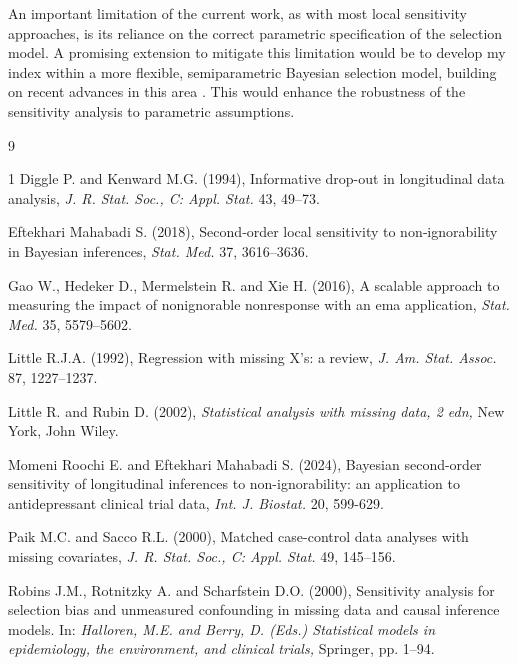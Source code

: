 \documentclass[twoside]{article}
\begin{document}
An important limitation of the current work, as with most local sensitivity
approaches, is its reliance on the correct parametric specification of the selection
model. A promising extension to mitigate this
limitation would be to develop my index within a more flexible, semiparametric
Bayesian selection model, building on recent advances in this area \cite{Sugasawa:et:al:2022}. This would enhance the robustness of
the sensitivity analysis to parametric assumptions.
\begin{thebibliography}{9}
\begin{spacing}{1}
Diggle P. and Kenward  M.G. (1994), Informative drop-out in longitudinal
data analysis, {\it J. R. Stat. Soc., C: Appl. Stat.}
43, 49–73.

Eftekhari Mahabadi S. (2018), Second‐order local sensitivity to non‐ignorability
in Bayesian inferences, {\it Stat. Med.} 37, 3616–3636.

Gao W., Hedeker D., Mermelstein R. and Xie H. (2016), A scalable approach
to measuring the impact of nonignorable nonresponse with an ema application,
{\it Stat. Med.} 35, 5579–5602.

Little R.J.A. (1992), Regression with missing X's: a review, {\it J. Am. Stat. Assoc.} 87,  1227–1237.

Little R. and Rubin D. (2002), {\it Statistical analysis with missing data, 2 edn,}
 New York, John Wiley.
 
Momeni Roochi E. and Eftekhari Mahabadi S. (2024), Bayesian second-order
sensitivity of longitudinal inferences to non-ignorability: an application to antidepressant
clinical trial data, {\it Int. J. Biostat.} 20, 599-629.
 
Paik M.C. and Sacco R.L. (2000), Matched case-control data analyses
with missing covariates, {\it J. R. Stat. Soc., C: Appl. Stat.} 49, 145–156.

Robins J.M., Rotnitzky A. and Scharfstein D.O. (2000), Sensitivity
analysis for selection bias and unmeasured confounding in missing
data and causal inference models. In: {\it Halloren, M.E. and Berry,
D. (Eds.) Statistical models in epidemiology, the environment, and
clinical trials,} Springer, pp. 1–94.


\end{spacing}
\end{thebibliography}
\end{document}
